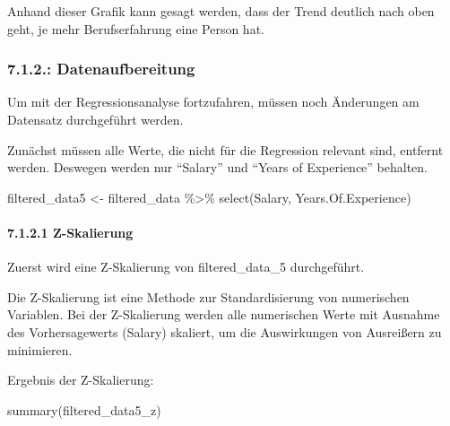 \documentclass[
  letterpaper,
  DIV=11,
  numbers=noendperiod]{scrartcl}
\let\oldparagraph\paragraph
\renewcommand{\paragraph}[1]{\oldparagraph{#1}\mbox{}}
\newenvironment{Shaded}{\begin{snugshade}}{\end{snugshade}}
\newcommand{\FunctionTok}[1]{\textcolor[rgb]{0.28,0.35,0.67}{#1}}
\newcommand{\NormalTok}[1]{\textcolor[rgb]{0.00,0.23,0.31}{#1}}
\newcommand{\OtherTok}[1]{\textcolor[rgb]{0.00,0.23,0.31}{#1}}
\newcommand{\SpecialCharTok}[1]{\textcolor[rgb]{0.37,0.37,0.37}{#1}}
\begin{document}
Anhand dieser Grafik kann gesagt werden, dass der Trend deutlich nach
oben geht, je mehr Berufserfahrung eine Person hat.

\hypertarget{datenaufbereitung-1}{%
\subsubsection{7.1.2.: Datenaufbereitung}\label{datenaufbereitung-1}}

Um mit der Regressionsanalyse fortzufahren, müssen noch Änderungen am
Datensatz durchgeführt werden.

Zunächst müssen alle Werte, die nicht für die Regression relevant sind,
entfernt werden. Deswegen werden nur ``Salary'' und ``Years of
Experience'' behalten.

\begin{Shaded}
\begin{Highlighting}[]
\NormalTok{filtered\_data5 }\OtherTok{\textless{}{-}}\NormalTok{ filtered\_data }\SpecialCharTok{\%\textgreater{}\%}
  \FunctionTok{select}\NormalTok{(Salary, Years.Of.Experience)}
\end{Highlighting}
\end{Shaded}

\hypertarget{z-skalierung}{%
\paragraph{7.1.2.1 Z-Skalierung}\label{z-skalierung}}

Zuerst wird eine Z-Skalierung von filtered\_data\_5 durchgeführt.

Die Z-Skalierung ist eine Methode zur Standardisierung von numerischen
Variablen. Bei der Z-Skalierung werden alle numerischen Werte mit
Ausnahme des Vorhersagewerts (Salary) skaliert, um die Auswirkungen von
Ausreißern zu minimieren.

\begin{Shaded}
\end{Shaded}

Ergebnis der Z-Skalierung:

\begin{Shaded}
\begin{Highlighting}[]
\FunctionTok{summary}\NormalTok{(filtered\_data5\_z)}
\end{Highlighting}
\end{Shaded}
\end{document}
